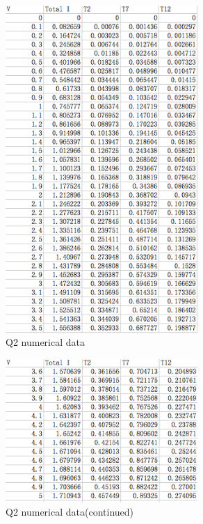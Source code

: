 \documentclass[12pt,a4paper]{article}
\begin{document}
\begin{figure}[h!]
  \centering
     \includegraphics[width=0.65\textwidth]{./q21numerical.png}
  \caption{Q2 numerical data}
\end{figure}
\begin{figure}[h!]
  \centering
     \includegraphics[width=0.65\textwidth]{./q22numerical.png}
  \caption{Q2 numerical data(continued)}
\end{figure}
\end{document}
